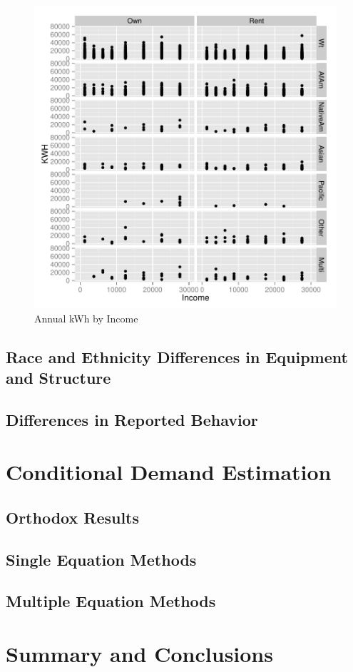 \documentclass{article}
\begin{document}
\begin{figure}
\begin{center}
\caption{Annual kWh by Income}
\label{fig:kWhbyIncome}
\includegraphics{DraftEdwardsWoods-005}
\end{center}
\end{figure}

  \subsection{Race and Ethnicity Differences in Equipment and Structure}
  
  
  
  \subsection{Differences in Reported Behavior}
  
  

\section{Conditional Demand Estimation}

  \subsection{Orthodox Results}
  \subsection{Single Equation Methods}
  \subsection{Multiple Equation Methods}
  
\section{Summary and Conclusions}

\nocite{*}


\end{document}
